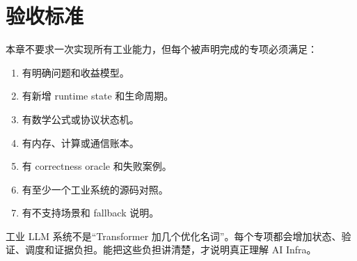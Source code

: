 \section{验收标准}

本章不要求一次实现所有工业能力，但每个被声明完成的专项必须满足：

\begin{enumerate}
  \item 有明确问题和收益模型。
  \item 有新增 runtime state 和生命周期。
  \item 有数学公式或协议状态机。
  \item 有内存、计算或通信账本。
  \item 有 correctness oracle 和失败案例。
  \item 有至少一个工业系统的源码对照。
  \item 有不支持场景和 fallback 说明。
\end{enumerate}

\begin{keyidea}
工业 LLM 系统不是“Transformer 加几个优化名词”。每个专项都会增加状态、验证、调度和证据负担。能把这些负担讲清楚，才说明真正理解 AI Infra。
\end{keyidea}
